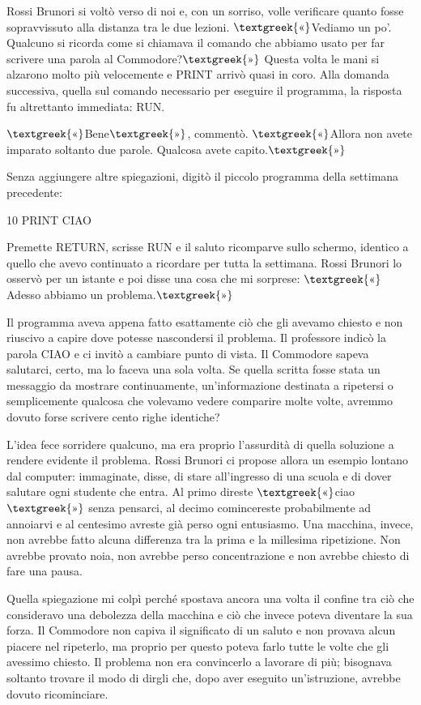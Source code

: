 \documentclass{article}
\begin{document}
Rossi Brunori si voltò verso di noi e, con un sorriso, volle verificare quanto fosse sopravvissuto alla distanza tra le
due lezioni. $\text{\textgreek{«}}$Vediamo un po'. Qualcuno si ricorda come si chiamava il comando che abbiamo usato
per far scrivere una parola al Commodore?$\text{\textgreek{»}}$ Questa volta le mani si alzarono molto più velocemente
e PRINT arrivò quasi in coro. Alla domanda successiva, quella sul comando necessario per eseguire il programma, la
risposta fu altrettanto immediata: RUN.

$\text{\textgreek{«}}$Bene$\text{\textgreek{»}}$, commentò. $\text{\textgreek{«}}$Allora non avete imparato soltanto due
parole. Qualcosa avete capito.$\text{\textgreek{»}}$

Senza aggiungere altre spiegazioni, digitò il piccolo programma della settimana precedente:

10 PRINT {\textquotedbl}CIAO{\textquotedbl}

Premette RETURN, scrisse RUN e il saluto ricomparve sullo schermo, identico a quello che avevo continuato a ricordare
per tutta la settimana. Rossi Brunori lo osservò per un istante e poi disse una cosa che mi sorprese:
$\text{\textgreek{«}}$Adesso abbiamo un problema.$\text{\textgreek{»}}$

Il programma aveva appena fatto esattamente ciò che gli avevamo chiesto e non riuscivo a capire dove potesse nascondersi
il problema. Il professore indicò la parola CIAO e ci invitò a cambiare punto di vista. Il Commodore sapeva salutarci,
certo, ma lo faceva una sola volta. Se quella scritta fosse stata un messaggio da mostrare continuamente,
un'informazione destinata a ripetersi o semplicemente qualcosa che volevamo vedere comparire molte volte, avremmo
dovuto forse scrivere cento righe identiche?

L'idea fece sorridere qualcuno, ma era proprio l'assurdità di quella soluzione a rendere evidente il problema. Rossi
Brunori ci propose allora un esempio lontano dal computer: immaginate, disse, di stare all'ingresso di una scuola e di
dover salutare ogni studente che entra. Al primo direste $\text{\textgreek{«}}$ciao$\text{\textgreek{»}}$ senza
pensarci, al decimo comincereste probabilmente ad annoiarvi e al centesimo avreste già perso ogni entusiasmo. Una
macchina, invece, non avrebbe fatto alcuna differenza tra la prima e la millesima ripetizione. Non avrebbe provato
noia, non avrebbe perso concentrazione e non avrebbe chiesto di fare una pausa.

Quella spiegazione mi colpì perché spostava ancora una volta il confine tra ciò che consideravo una debolezza della
macchina e ciò che invece poteva diventare la sua forza. Il Commodore non capiva il significato di un saluto e non
provava alcun piacere nel ripeterlo, ma proprio per questo poteva farlo tutte le volte che gli avessimo chiesto. Il
problema non era convincerlo a lavorare di più; bisognava soltanto trovare il modo di dirgli che, dopo aver eseguito
un'istruzione, avrebbe dovuto ricominciare.
\end{document}
